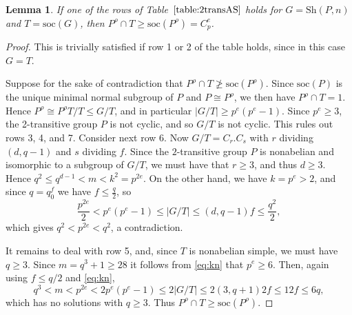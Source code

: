 \documentclass[12pt]{amsart}
\newtheorem{lem}[thm]{Lemma}
\theoremstyle{remark}
\theoremstyle{definition}
\newcommand{\soc}{\mathrm{soc}}
\newcommand{\sym}{\mathrm{Sym}}
\newcommand{\sh}{\mathrm{Sh}}
\begin{document}
\begin{lem} \label{lemma:socP}
If one of the rows of Table~$\ref{table:2transAS}$ holds for $G = \sh(P,n)$ and $T = \soc(G)$, then $P^\rho \cap T \geqslant \soc(P^\rho) = C_p^e$.
\end{lem}
\begin{proof}
This is trivially satisfied if row 1 or 2 of the table holds, since in this case $G = T$.

Suppose for the sake of contradiction that $P^\rho \cap T \ngeqslant \soc(P^\rho)$. Since $\soc(P)$ is the unique minimal normal subgroup of $P $ and $P \cong P^\rho$, we then have $P^\rho \cap T = 1$. Hence $P^\rho \cong P^\rho T/T \leqslant G/T$, and in particular $|G/T| \geqslant p^e(p^e-1)$.  Since $p^e \geqslant 3$, the 2-transitive group $P$ is not cyclic, and so $G/T$ is not cyclic. This rules out rows 3, 4, and 7. Consider next row 6. Now $G/T = C_r . C_s$ with $r$ dividing $(d,q-1)$ and $s$ dividing $f$.  Since the $2$-transitive group $P$ is nonabelian and isomorphic to a subgroup of $G/T$, we must have that $r \geqslant 3$, and thus $d\geqslant 3$.  Hence $q^2 \leqslant q^{d-1} < m < k^2 = p^{2e}$. On the other hand, we have $k=p^e > 2$, and since  $q=q_0^f$ we have $f \leqslant \frac{q}{2}$, so 
	\begin{equation} \label{eq:p^2e}
	\frac{p^{2e}}{2} < p^e(p^e-1) \leqslant |G/T| \leqslant (d,q-1)f \leqslant \frac{q^2}{2},
	\end{equation}
which gives $q^2 < p^{2e} < q^2$, a contradiction.


%


It remains to deal with row 5, and, since $T$ is nonabelian simple, we must have $q \geqslant 3$. 
Since $m=q^3+1\geqslant28$ it follows from \eqref{eq:kn} that $p^e\geqslant6$. Then, again using $f \leqslant q/2$ and \eqref{eq:kn},
	\[ 
	q^3 < m < p^{2e} < 2p^e(p^e-1) \leqslant 2|G/T| \leqslant 2(3,q+1)2f \leqslant 12f \leqslant 6q, 
	\]
which has no solutions with $q \geqslant 3$. Thus $P^\rho \cap T \geqslant \soc(P^\rho)$. 
\end{proof}
\end{document}

